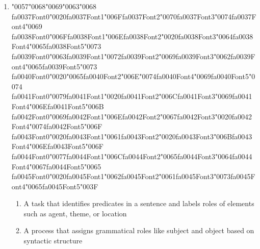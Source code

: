 \documentclass[12pt]{article}
\begin{document}
\begin{enumerate}[label=Q\arabic*.]
\item {\char"0057}{\char"0068}{\char"0069}{\char"0063}{\char"0068} {\csname fa0037Font0\endcsname\char"0020}{\csname fa0037Font1\endcsname\char"006F}{\csname fa0037Font2\endcsname\char"0070}{\csname fa0037Font3\endcsname\char"0074}{\csname fa0037Font4\endcsname\char"0069} {\csname fa0038Font0\endcsname\char"006F}{\csname fa0038Font1\endcsname\char"006E}{\csname fa0038Font2\endcsname\char"0020}{\csname fa0038Font3\endcsname\char"0064}{\csname fa0038Font4\endcsname\char"0065}{\csname fa0038Font5\endcsname\char"0073} {\csname fa0039Font0\endcsname\char"0063}{\csname fa0039Font1\endcsname\char"0072}{\csname fa0039Font2\endcsname\char"0069}{\csname fa0039Font3\endcsname\char"0062}{\csname fa0039Font4\endcsname\char"0065}{\csname fa0039Font5\endcsname\char"0073} {\csname fa0040Font0\endcsname\char"0020}{\char"0065}{\csname fa0040Font2\endcsname\char"006E}{\char"0074}{\csname fa0040Font4\endcsname\char"0069}{\csname fa0040Font5\endcsname\char"0074} {\csname fa0041Font0\endcsname\char"0079}{\csname fa0041Font1\endcsname\char"0020}{\csname fa0041Font2\endcsname\char"006C}{\csname fa0041Font3\endcsname\char"0069}{\csname fa0041Font4\endcsname\char"006E}{\csname fa0041Font5\endcsname\char"006B} {\csname fa0042Font0\endcsname\char"0069}{\csname fa0042Font1\endcsname\char"006E}{\csname fa0042Font2\endcsname\char"0067}{\csname fa0042Font3\endcsname\char"0020}{\csname fa0042Font4\endcsname\char"0074}{\csname fa0042Font5\endcsname\char"006F} {\csname fa0043Font0\endcsname\char"0020}{\csname fa0043Font1\endcsname\char"0061}{\csname fa0043Font2\endcsname\char"0020}{\csname fa0043Font3\endcsname\char"006B}{\csname fa0043Font4\endcsname\char"006E}{\csname fa0043Font5\endcsname\char"006F} {\csname fa0044Font0\endcsname\char"0077}{\csname fa0044Font1\endcsname\char"006C}{\csname fa0044Font2\endcsname\char"0065}{\csname fa0044Font3\endcsname\char"0064}{\csname fa0044Font4\endcsname\char"0067}{\csname fa0044Font5\endcsname\char"0065} {\csname fa0045Font0\endcsname\char"0020}{\csname fa0045Font1\endcsname\char"0062}{\csname fa0045Font2\endcsname\char"0061}{\csname fa0045Font3\endcsname\char"0073}{\csname fa0045Font4\endcsname\char"0065}{\csname fa0045Font5\endcsname\char"003F}
\begin{enumerate}[label=(\Alph*)]
    \item A task that identifies predicates in a sentence and labels roles of elements such as agent, theme, or location
    \item A process that assigns grammatical roles like subject and object based on syntactic structure

\end{enumerate}
\end{enumerate}
\end{document}
